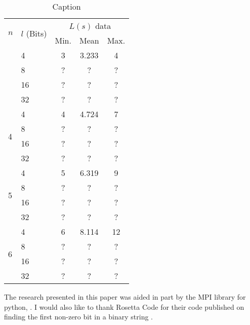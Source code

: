 \documentclass[10pt]{article}
\begin{document}
\begin{table}[ht]
    \centering
    \begin{tabular}{l l|c c c}
    \hline
        \multirow{2}{*}{$n$} & \multirow{2}{*}{$l$ (Bits)} & \multicolumn{3}{c}{$L(s)$ data} \\
         & & Min. & Mean & Max.\\
        \Xhline{3\arrayrulewidth}
        \multirow{4}{*}{3} & 4 & 3 & 3.233 & 4 \\
         & 8 & ? & ? & ? \\
         & 16 & ? & ? & ? \\
         & 32 & ? & ? & ? \\
        \hline
        \multirow{4}{*}{4} & 4 & 4 & 4.724 & 7 \\
         & 8 & ? & ? & ? \\
         & 16 & ? & ? & ? \\
         & 32 & ? & ? & ? \\
        \hline
        \multirow{4}{*}{5} & 4 & 5 & 6.319 & 9 \\
         & 8 & ? & ? & ? \\
         & 16 & ? & ? & ? \\
         & 32 & ? & ? & ? \\
        \hline
        \multirow{4}{*}{6} & 4 & 6 & 8.114 & 12 \\
         & 8 & ? & ? & ? \\
         & 16 & ? & ? & ? \\
         & 32 & ? & ? & ? \\
        \hline
    \end{tabular}
    \caption{Caption}
    \label{tab:L(s)Analysis}
\end{table}

\begin{acknowledgements}
The research presented in this paper was aided in part by the MPI library for python, \cite{DALCIN20051108}. I would also like to thank Rosetta Code for their code published on finding the first non-zero bit in a binary string \cite{rosetta_code_2021}.
\end{acknowledgements}

\printbibliography
\end{document}
